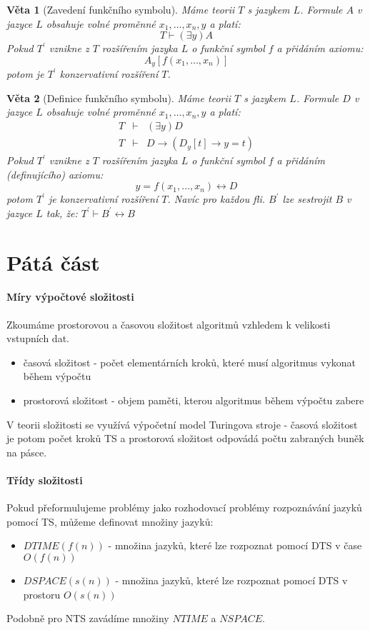\documentclass[a4paper]{article}      %
\newtheorem{theorem}{Věta}[section]
\begin{document}
\begin{theorem}[Zavedení funkčního symbolu]
Máme teorii $T$ s jazykem $L$. Formule $A$ v jazyce $L$ obsahuje volné proměnné $x_1,\ldots,x_n,y$ a platí:
\[
T \vdash (\exists y)A
\]
Pokud $T^{'}$ vznikne z $T$ rozšířením jazyka $L$ o funkční symbol $f$ a přidáním axiomu:
\[
A_{y}[f(x_1,\ldots,x_n)]
\]
potom je $T^{'}$ konzervativní rozšíření $T$.
\end{theorem}

\begin{theorem}[Definice funkčního symbolu]
Máme teorii $T$ s jazykem $L$. Formule $D$ v jazyce $L$ obsahuje volné proměnné $x_1,\ldots,x_n,y$ a platí:
\[
\begin{array}{rcl}
T & \vdash & (\exists y)D\\
T & \vdash & D \rightarrow (D_{y}[t] \rightarrow y=t)
\end{array}
\]
Pokud $T^{'}$ vznikne z $T$ rozšířením jazyka $L$ o funkční symbol $f$ a přidáním (definujícího) axiomu:
\[
y=f(x_1,\ldots,x_n) \leftrightarrow D
\]
potom $T^{'}$ je konzervativní rozšíření $T$. Navíc pro každou fli. $B^{'}$ lze sestrojit $B$ v jazyce $L$ tak, že:
$T^{'} \vdash B^{'} \leftrightarrow B$
\end{theorem}

\section{Pátá část}

\paragraph{Míry výpočtové složitosti}
Zkoumáme prostorovou a časovou složitost algoritmů vzhledem k velikosti vstupních dat.
\begin{itemize}
\item časová složitost - počet elementárních kroků, které musí algoritmus vykonat během výpočtu
\item prostorová složitost - objem paměti, kterou algoritmus během výpočtu zabere
\end{itemize}

V teorii složitosti se využívá výpočetní model Turingova stroje - časová složitost je potom počet kroků TS a prostorová složitost odpovádá
počtu zabraných buněk na pásce.

\paragraph{Třídy složitosti}
Pokud přeformulujeme problémy jako rozhodovací problémy rozpoznávání jazyků pomocí TS, můžeme definovat množiny jazyků:
\begin{itemize}
\item $DTIME(f(n))$ - množina jazyků, které lze rozpoznat pomocí DTS v čase $O(f(n))$
\item $DSPACE(s(n))$ - množina jazyků, které lze rozpoznat pomocí DTS v prostoru $O(s(n))$ 
\end{itemize}
Podobně pro NTS zavádíme množiny $NTIME$ a $NSPACE$.
\end{document}
